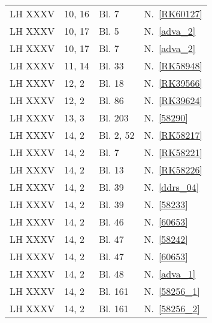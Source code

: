 \begin{longtable}{llll}
%
LH XXXV & 10, 16 & Bl. 7 & N.~\ref{RK60127}\\
%
LH XXXV & 10, 17 & Bl. 5\textendash 6 & N.~\ref{adva_2}\\
LH XXXV & 10, 17 & Bl. 7\textendash 8 & N.~\ref{adva_2}\\
%
LH XXXV & 11, 14 & Bl. 33 & N.~\ref{RK58948}\\
%
LH XXXV & 12, 2 & Bl. 18 & N.~\ref{RK39566}\\
LH XXXV & 12, 2 & Bl. 86 & N.~\ref{RK39624}\\
%
LH XXXV & 13, 3 & Bl. 203 & N.~\ref{58290}\\
%
LH XXXV & 14, 2 & Bl. 2, 52 & N.~\ref{RK58217}\\
LH XXXV & 14, 2 & Bl. 7 & N.~\ref{RK58221}\\
LH XXXV & 14, 2 & Bl. 13 & N.~\ref{RK58226}\\
LH XXXV & 14, 2 & Bl. 39 & N.~\ref{ddrs_04}\\
LH XXXV & 14, 2 & Bl. 39 & N.~\ref{58233}\\
LH XXXV & 14, 2 & Bl. 46 & N.~\ref{60653}\\
LH XXXV & 14, 2 & Bl. 47 & N.~\ref{58242}\\
LH XXXV & 14, 2 & Bl. 47 & N.~\ref{60653}\\
LH XXXV & 14, 2 & Bl. 48 & N.~\ref{adva_1}\\
LH XXXV & 14, 2 & Bl. 161\textendash 162 & N.~\ref{58256_1}\\
LH XXXV & 14, 2 & Bl. 161\textendash 162 & N.~\ref{58256_2}\\

\end{longtable}
